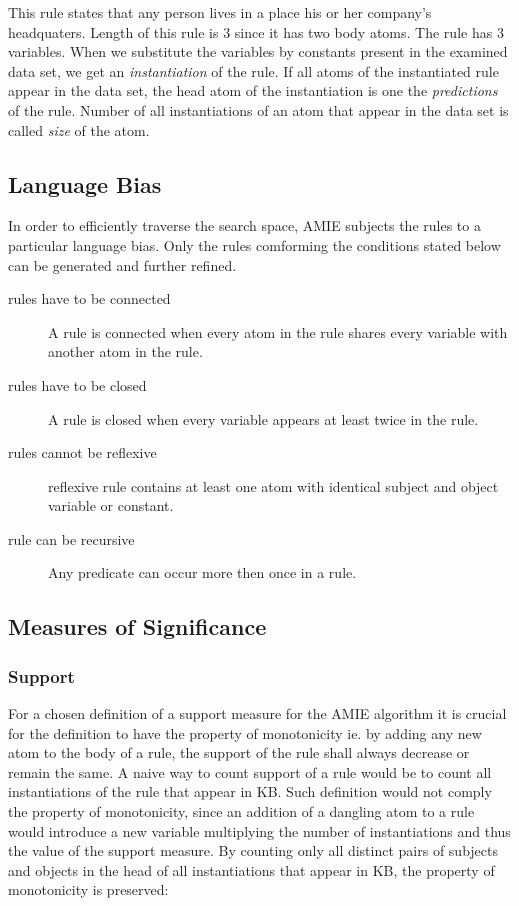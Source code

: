 This rule states that any person lives in a place his or her company's headquaters. Length of this rule is 3 since it has two body atoms. The rule has 3 variables. When we substitute the variables by constants present in the examined data set, we get an \textit{instantiation} of the rule. If all atoms of the instantiated rule appear in the data set, the head atom of the instantiation is one the \textit{predictions} of the rule. Number of all instantiations of an atom that appear in the data set is called \textit{size} of the atom.

\subsection{Language Bias}

In order to efficiently traverse the search space, AMIE subjects the rules to a particular language bias. Only the rules comforming the conditions stated below can be generated and further refined.

\begin{description}
    \item[rules have to be connected] A rule is connected when every atom in the rule shares every variable with another atom in the rule.
    \item[rules have to be closed] A rule is closed when every variable appears at least twice in the rule.
    \item[rules cannot be reflexive] reflexive rule contains at least one atom with identical subject and object variable or constant.
    \item[rule can be recursive] Any predicate can occur more then once in a rule.
\end{description}

\subsection{Measures of Significance}

\subsubsection{Support}

For a chosen definition of a support measure for the AMIE algorithm it is crucial for the definition to have the property of monotonicity ie. by adding any new atom to the body of a rule, the support of the rule shall always decrease or remain the same. A naive way to count support of a rule would be to count all instantiations of the rule that appear in KB. Such definition would not comply the property of monotonicity, since an addition of a dangling atom to a rule would introduce a new variable multiplying the number of instantiations and thus the value of the support measure. By counting only all distinct pairs of subjects and objects in the head of all instantiations that appear in KB, the property of monotonicity is preserved:

